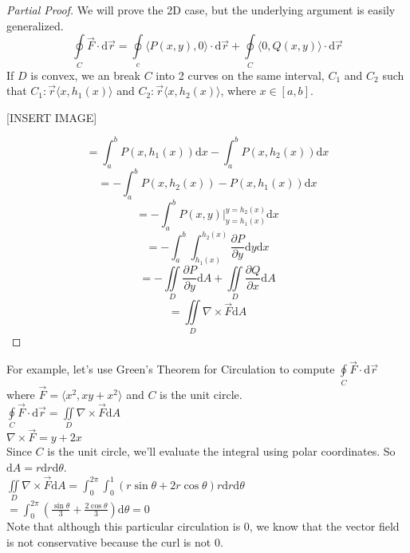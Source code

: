 \begin{proof}[Partial Proof]
	We will prove the 2D case, but the underlying argument is easily generalized.
	\begin{equation*}
		\oint\limits_{C}{\vec{F} \cdot \mathrm{d}\vec{r}} = \oint\limits_{c}{\langle P(x,y), 0 \rangle \cdot \mathrm{d}\vec{r}} + \oint\limits_{C}{\langle 0, Q(x,y) \rangle \cdot \mathrm{d}\vec{r}}
	\end{equation*}
	If $D$ is convex, we an break $C$ into 2 curves on the same interval, $C_1$ and $C_2$ such that $C_1 : \vec{r} \langle x, h_1(x) \rangle$ and $C_2 : \vec{r} \langle x, h_2(x) \rangle$, where $x \in [a,b]$.
	
	[INSERT IMAGE]
	
	\begin{equation*}
		= \int_{a}^{b}{P(x,h_1(x))\mathrm{d}x} - \int_{a}^{b}{P(x,h_2(x))\mathrm{d}x}
	\end{equation*} \begin{equation*}
		= -\int_{a}^{b}{P(x,h_2(x)) - P(x,h_1(x))\mathrm{d}x}
	\end{equation*} \begin{equation*}
		= -\int_{a}^{b}{P(x,y)\rvert_{y=h_1(x)}^{y=h_2(x)}\mathrm{d}x}
	\end{equation*} \begin{equation*}
		= -\int_{a}^{b}{\int_{h_1(x)}^{h_2(x)}{\frac{\partial P}{\partial y}\mathrm{d}y}\mathrm{d}x}
	\end{equation*} \begin{equation*}
		= -\iint\limits_{D}{\frac{\partial P}{\partial y}\mathrm{d}A} + \iint\limits_{D}{\frac{\partial Q}{\partial x}\mathrm{d}A}
	\end{equation*} \begin{equation*}
		= \iint\limits_{D}{\nabla \times \vec{F}\mathrm{d}A}
	\end{equation*}
\end{proof}

\noindent
For example, let's use Green's Theorem for Circulation to compute $\oint\limits_{C}{\vec{F} \cdot \mathrm{d}\vec{r}}$ where $\vec{F} = \langle x^2, xy + x^2 \rangle$ and $C$ is the unit circle.\\
\indent
$\oint\limits_{C}{\vec{F} \cdot \mathrm{d}\vec{r}} = \iint\limits_{D}{\nabla \times \vec{F}\mathrm{d}A}$\\
\indent
$\nabla \times \vec{F} = y+2x$\\
Since $C$ is the unit circle, we'll evaluate the integral using polar coordinates. So $\mathrm{d}A = r\mathrm{d}r\mathrm{d}\theta$.\\
$\iint\limits_{D}{\nabla \times \vec{F}\mathrm{d}A} = \int_{0}^{2\pi}{\int_{0}^{1}{(r\sin{\theta} + 2r\cos{\theta})r\mathrm{d}r}\mathrm{d}\theta}$\\
\indent
$= \int_{0}^{2\pi}{\left(\frac{\sin{\theta}}{3} + \frac{2\cos{\theta}}{3}\right)\mathrm{d}\theta} = 0$\\
\indent
Note that although this particular circulation is 0, we know that the vector field is not conservative because the curl is not 0.

